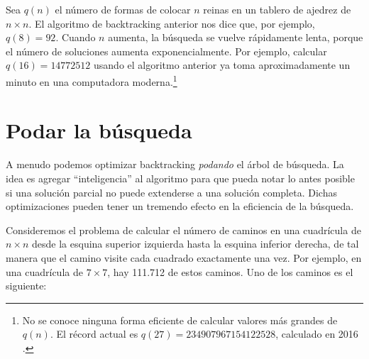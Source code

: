 \begin{center}
\end{center}

Sea $q(n)$ el número de formas de
colocar $n$ reinas en un tablero de ajedrez de $n \times n$.
El algoritmo de backtracking anterior nos dice que, por ejemplo, $q(8)=92$.
Cuando $n$ aumenta, la búsqueda se vuelve rápidamente lenta,
porque el número de soluciones aumenta
exponencialmente.
Por ejemplo, calcular $q(16)=14772512$
usando el algoritmo anterior ya toma aproximadamente un minuto
en una computadora moderna.\footnote{No se conoce ninguna forma eficiente de
    calcular valores más grandes de $q(n)$. El récord actual es
    $q(27)=234907967154122528$, calculado en 2016 \cite{q27}.}

\newpage
\section{Podar la búsqueda}

A menudo podemos optimizar backtracking \emph{podando} el árbol de búsqueda.
La idea es agregar ``inteligencia'' al algoritmo
para que pueda notar lo antes posible
si una solución parcial no puede extenderse
a una solución completa.
Dichas optimizaciones pueden tener un tremendo
efecto en la eficiencia de la búsqueda.

Consideremos el problema
de calcular el número de caminos
en una cuadrícula de $n \times n$ desde la esquina superior izquierda
hasta la esquina inferior derecha, de tal manera que
el camino visite cada cuadrado exactamente una vez.
Por ejemplo, en una cuadrícula de $7 \times 7$,
hay 111.712 de estos caminos.
Uno de los caminos es el siguiente:

\begin{center}
\end{center}

